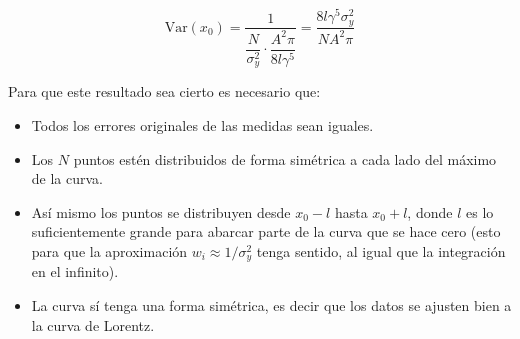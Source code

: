 \begin{equation}
    \boxed{\mathrm{Var}(x_0) = \frac{1}{\dfrac{N}{\sigma_y^2}\cdot\dfrac{A^2\pi}{8l\gamma^5}} = \frac{8l\gamma^5\sigma_y^2}{NA^2\pi}} \label{eq:var_final}
\end{equation}

Para que este resultado sea cierto es necesario que:
\begin{itemize}
    \item Todos los errores originales de las medidas sean iguales.
    \item Los $N$ puntos estén distribuidos de forma simétrica a cada lado del máximo de la curva.
    \item Así mismo los puntos se distribuyen desde $x_0 - l$ hasta $x_0 + l$, donde $l$ es lo suficientemente grande para abarcar parte de la curva que se hace cero (esto para que la aproximación $w_i \approx 1/\sigma_y^2$ tenga sentido, al igual que la integración en el infinito).
    \item La curva sí tenga una forma simétrica, es decir que los datos se ajusten bien a la curva de Lorentz.
\end{itemize}


